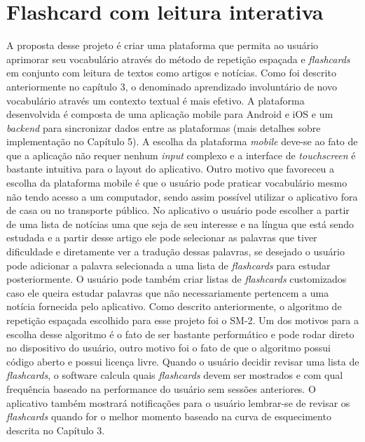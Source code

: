 \section{Flashcard com leitura interativa}
A proposta desse projeto é criar uma plataforma que permita ao usuário aprimorar seu vocabulário através do método de repetição espaçada e \textit{flashcards} em conjunto com leitura de textos como artigos e notícias. Como foi descrito anteriormente no capítulo 3, o denominado aprendizado involuntário de novo vocabulário através um contexto textual é mais efetivo. A plataforma desenvolvida é composta de uma aplicação mobile para Android e iOS e um \textit{backend} para sincronizar dados entre as plataformas (mais detalhes sobre implementação no Capítulo 5). A escolha da plataforma \textit{mobile} deve-se ao fato de que a aplicação não requer nenhum \textit{input} complexo e a interface de \textit{touchscreen} é bastante intuitiva para o layout do aplicativo. Outro motivo que favoreceu a escolha da plataforma mobile é que o usuário pode praticar vocabulário mesmo não tendo acesso a um computador, sendo assim possível utilizar o aplicativo fora de casa ou no transporte público. No aplicativo o usuário pode escolher a partir de uma lista de notícias uma que seja de seu interesse e na língua que está sendo estudada e a partir desse artigo ele pode selecionar as palavras que tiver dificuldade e diretamente ver a tradução dessas palavras, se desejado o usuário pode adicionar a palavra selecionada a uma lista de \textit{flashcards} para estudar posteriormente. O usuário pode também criar listas de \textit{flashcards} customizados caso ele queira estudar palavras que não necessariamente pertencem a uma notícia fornecida pelo aplicativo. Como descrito anteriormente, o algoritmo de repetição espaçada escolhido para esse projeto foi o SM-2. Um dos motivos para a escolha desse algoritmo é o fato de ser bastante performático e pode rodar direto no dispositivo do usuário, outro motivo foi o fato de que o algoritmo possui código aberto e possui licença livre. Quando o usuário decidir revisar uma lista de \textit{flashcards}, o software calcula quais \textit{flashcards} devem ser mostrados e com qual frequência baseado na performance do usuário sem sessões anteriores. O aplicativo também mostrará notificações para o usuário lembrar-se de revisar os \textit{flashcards} quando for o melhor momento baseado na curva de esquecimento descrita no Capítulo 3.

